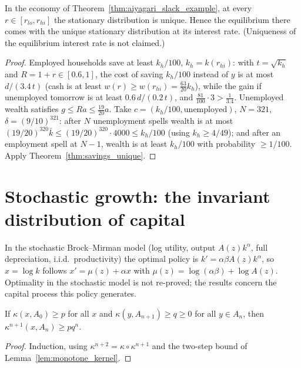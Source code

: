 \begin{theorem}
\label{thm:slack_unique}
\leanok
{}
In the economy of Theorem~\ref{thm:aiyagari_slack_example}, at every $r\in[r_{lo},r_{hi}]$ the stationary distribution
is unique. Hence the equilibrium there comes with the unique stationary distribution at its interest rate. (Uniqueness
of the equilibrium interest rate is not claimed.)
\end{theorem}
\begin{proof}
\leanok
Employed households save at least $k_h/100$, $k_h=k(r_{hi})$: with $t=\sqrt{k_h}$ and $R=1+r\in[0.6,1]$, the cost of
saving $k_h/100$ instead of $y$ is at most $d/(3.4\,t)$ (cash is at least $w(r)\ge w(r_{hi})=\tfrac{63}{20}k_h$), while
the gain if unemployed tomorrow is at least $0.6\,d/(0.2\,t)$, and $\tfrac{81}{100}\cdot3>\tfrac1{3.4}$. Unemployed wealth
satisfies $g\le Ra\le\tfrac{19}{20}a$. Take $c=(k_h/100,\text{unemployed})$, $N=321$, $\delta=(9/10)^{321}$: after
$N$ unemployment spells wealth is at most $(19/20)^{320}\bar k\le(19/20)^{320}\cdot4000\le k_h/100$ (using
$k_h\ge4/49$); and after an employment spell at $N-1$, wealth is at least $k_h/100$ with probability $\ge1/100$.
Apply Theorem~\ref{thm:savings_unique}.
\end{proof}

\section{Stochastic growth: the invariant distribution of capital}
\label{sec:stochastic_growth}

In the stochastic Brock--Mirman model (log utility, output $A(z)k^\alpha$, full depreciation, i.i.d.\ productivity)
the optimal policy is $k'=\alpha\beta A(z)k^\alpha$, so $x=\log k$ follows $x'=\mu(z)+\alpha x$ with
$\mu(z)=\log(\alpha\beta)+\log A(z)$. Optimality in the stochastic model is not re-proved; the results concern the
capital process this policy generates.

\begin{lemma}
\label{lem:chain_lower}
\leanok
{}
If $\kappa(x,A_0)\ge p$ for all $x$ and $\kappa(y,A_{n+1})\ge q\ge0$ for all $y\in A_n$, then
$\kappa^{n+1}(x,A_n)\ge pq^n$.
\end{lemma}
\begin{proof}
\leanok
Induction, using $\kappa^{n+2}=\kappa\circ\kappa^{n+1}$ and the two-step bound of Lemma~\ref{lem:monotone_kernel}.
\end{proof}

